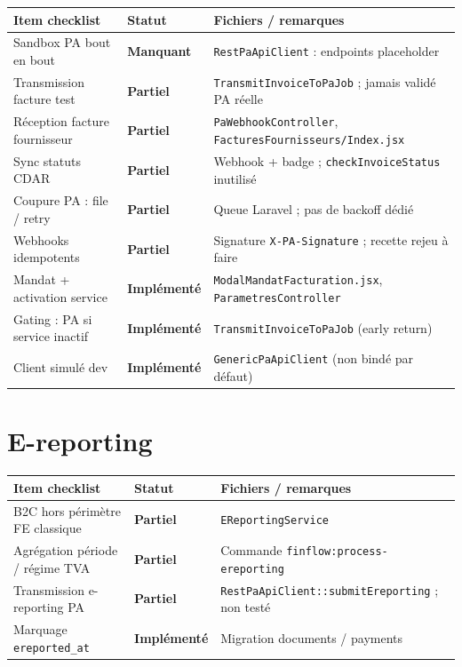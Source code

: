 \documentclass[11pt,a4paper]{report}
\newcommand{\route}[1]{\texttt{\small #1}}
\newcommand{\ctrl}[1]{\texttt{\small #1}}
\newcommand{\svc}[1]{\texttt{\small #1}}
\newcommand{\statimpl}{\textcolor{statok}{\textbf{Implémenté}}}
\newcommand{\statpart}{\textcolor{statpartial}{\textbf{Partiel}}}
\newcommand{\statmiss}{\textcolor{statno}{\textbf{Manquant}}}
\begin{document}
\begin{longtable}{@{}L{7.8cm}C{2.4cm}L{4.4cm}@{}}
    \toprule
    \textbf{Item checklist} & \textbf{Statut} & \textbf{Fichiers / remarques} \\
    \midrule
    \endhead
    Sandbox PA bout en bout & \statmiss & \svc{RestPaApiClient} : endpoints placeholder \\
    Transmission facture test & \statpart & \ctrl{TransmitInvoiceToPaJob} ; jamais validé PA réelle \\
    Réception facture fournisseur & \statpart & \ctrl{PaWebhookController}, \route{FacturesFournisseurs/Index.jsx} \\
    Sync statuts CDAR & \statpart & Webhook + badge ; \texttt{checkInvoiceStatus} inutilisé \\
    Coupure PA : file / retry & \statpart & Queue Laravel ; pas de backoff dédié \\
    Webhooks idempotents & \statpart & Signature \texttt{X-PA-Signature} ; recette rejeu à faire \\
    Mandat + activation service & \statimpl & \route{ModalMandatFacturation.jsx}, \ctrl{ParametresController} \\
    Gating : PA si service inactif & \statimpl & \ctrl{TransmitInvoiceToPaJob} (early return) \\
    Client simulé dev & \statimpl & \svc{GenericPaApiClient} (non bindé par défaut) \\
    \bottomrule
\end{longtable}

\section{E-reporting}

\begin{longtable}{@{}L{7.8cm}C{2.4cm}L{4.4cm}@{}}
    \toprule
    \textbf{Item checklist} & \textbf{Statut} & \textbf{Fichiers / remarques} \\
    \midrule
    \endhead
    B2C hors périmètre FE classique & \statpart & \svc{EReportingService} \\
    Agrégation période / régime TVA & \statpart & Commande \route{finflow:process-ereporting} \\
    Transmission e-reporting PA & \statpart & \svc{RestPaApiClient::submitEreporting} ; non testé \\
    Marquage \texttt{ereported\_at} & \statimpl & Migration documents / payments \\
    \bottomrule
\end{longtable}
\end{document}
